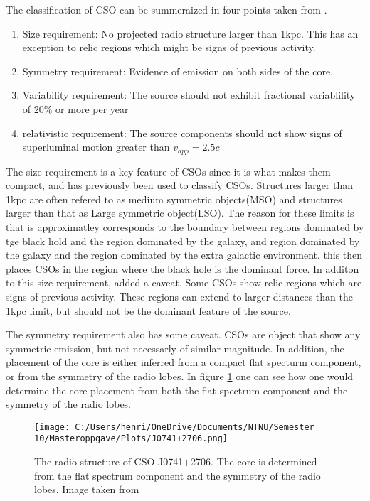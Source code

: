 The classification of CSO can be summeraized in four points taken from \cite{kiehlmann2023compact}. 

\begin{enumerate}
    \item Size requirement: No projected radio structure larger than 1kpc. This has an exception to relic regions which might be signs of previous activity. 
    \item Symmetry requirement: Evidence of emission on both sides of the core. 
    \item Variability requirement: The source should not exhibit fractional variablility of $20\%$ or more per year 
    \item relativistic requirement: The source components should not show signs of superluminal motion greater than $v_{app} = 2.5c$ 
\end{enumerate}

The size requirement is a key feature of CSOs since it is what makes them compact, and has previously been used to classify CSOs. Structures larger than 1kpc are often refered to as medium symmetric objects(MSO) and structures larger than that as Large symmetric object(LSO). The reason for these limits is that is approximatley corresponds to the boundary between regions dominated by tge black hold and the region dominated by the galaxy, and region dominated by the galaxy and the region dominated by the extra galactic environment. this then places CSOs in the region where the black hole is the dominant force. In additon to this size requirement, \cite{kiehlmann2023compact} added a caveat. Some CSOs show relic regions which are signs of previous activity. These regions can extend to larger distances than the 1kpc limit, but should not be the dominant feature of the source.

The symmetry requirement also has some caveat. CSOs are object that show any symmetric emission, but not necessarly of similar magnitude. In addition, the placement of the core is either inferred from a compact flat specturm component, or from the symmetry of the radio lobes. In figure \ref{fig:CSO_J0741} one can see how one would determine the core placement from both the flat spectrum component and the symmetry of the radio lobes.

\begin{figure}
    \centering
    \texttt{[image: C:/Users/henri/OneDrive/Documents/NTNU/Semester 10/Masteroppgave/Plots/J0741+2706.png]}
    \caption{The radio structure of CSO J0741+2706. The core is determined from the flat spectrum component and the symmetry of the radio lobes. Image taken from \cite{Tremblay_2016}}
    \label{fig:CSO_J0741}
\end{figure}


